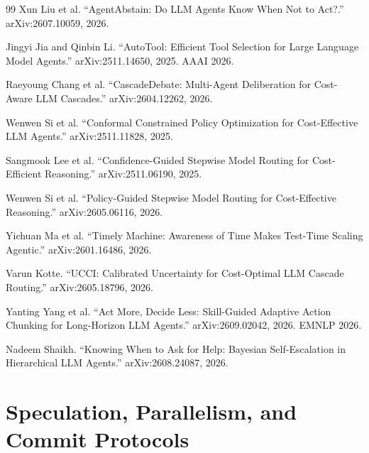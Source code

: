 \documentclass[11pt]{book}
\begin{document}
\begin{thebibliography}{99}
Xun Liu et al.
``AgentAbstain: Do LLM Agents Know When Not to Act?.''
arXiv:2607.10059, 2026.

Jingyi Jia and Qinbin Li.
``AutoTool: Efficient Tool Selection for Large Language Model Agents.''
arXiv:2511.14650, 2025. AAAI 2026.

Raeyoung Chang et al.
``CascadeDebate: Multi-Agent Deliberation for Cost-Aware LLM Cascades.''
arXiv:2604.12262, 2026.

Wenwen Si et al.
``Conformal Constrained Policy Optimization for Cost-Effective LLM Agents.''
arXiv:2511.11828, 2025.

Sangmook Lee et al.
``Confidence-Guided Stepwise Model Routing for Cost-Efficient Reasoning.''
arXiv:2511.06190, 2025.

Wenwen Si et al.
``Policy-Guided Stepwise Model Routing for Cost-Effective Reasoning.''
arXiv:2605.06116, 2026.

Yichuan Ma et al.
``Timely Machine: Awareness of Time Makes Test-Time Scaling Agentic.''
arXiv:2601.16486, 2026.

Varun Kotte.
``UCCI: Calibrated Uncertainty for Cost-Optimal LLM Cascade Routing.''
arXiv:2605.18796, 2026.

Yanting Yang et al.
``Act More, Decide Less: Skill-Guided Adaptive Action Chunking for Long-Horizon LLM Agents.''
arXiv:2609.02042, 2026. EMNLP 2026.

Nadeem Shaikh.
``Knowing When to Ask for Help: Bayesian Self-Escalation in Hierarchical LLM Agents.''
arXiv:2608.24087, 2026.
\end{thebibliography}


\chapter{Speculation, Parallelism, and Commit Protocols}
\label{ch:speculation}
\end{document}
